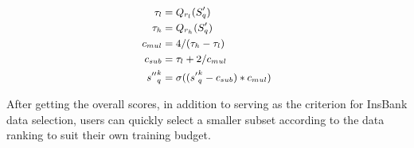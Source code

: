 \begin{equation}
\small
\begin{aligned}
    \tau_l &= Q_{r_l}(S'_q) \\
    \tau_h &= Q_{r_h}(S'_q) \\
    c_{mul} &= 4 / (\tau_h - \tau_l) \\
    c_{sub} &= \tau_l + 2 / c_{mul} \\
    {s''}^k_q &= \sigma(({s'}^k_q - c_{sub}) * c_{mul})
\end{aligned}
\label{eq: nonlinear-combine}    
\end{equation}

After getting the overall scores, in addition to serving as the criterion for InsBank data selection, users can quickly select a smaller subset according to the data ranking to suit their own training budget.
